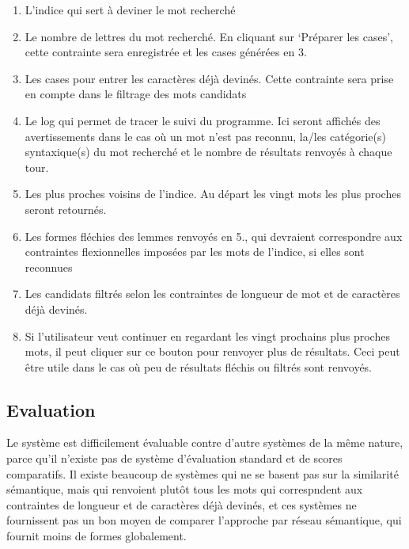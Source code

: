 \begin{enumerate}
    \item{L'indice qui sert à deviner le mot recherché}
    \item{Le nombre de lettres du mot recherché. En cliquant sur \lq{Préparer les cases}\rq, cette contrainte sera enregistrée et les cases générées en 3.}
    \item{Les cases pour entrer les caractères déjà devinés. Cette contrainte sera prise en compte dans le filtrage des mots candidats}
    \item{Le log qui permet de tracer le suivi du programme. Ici seront affichés des avertissements dans le cas où un mot n'est pas reconnu, la/les catégorie(s) syntaxique(s) du mot recherché et le nombre de résultats renvoyés à chaque tour.}
    \item{Les plus proches voisins de l'indice. Au départ les vingt mots les plus proches seront retournés.}
    \item{Les formes fléchies des lemmes renvoyés en 5., qui devraient correspondre aux contraintes flexionnelles imposées par les mots de l'indice, si elles sont reconnues}
    \item{Les candidats filtrés selon les contraintes de longueur de mot et de caractères déjà devinés.}
    \item{Si l'utilisateur veut continuer en regardant les vingt prochains plus proches mots, il peut cliquer sur ce bouton pour renvoyer plus de résultats. Ceci peut être utile dans le cas où peu de résultats fléchis ou filtrés sont renvoyés.}
    
\end{enumerate}


\subsection{Evaluation}
Le système est difficilement évaluable contre d'autre systèmes de la même nature, parce qu'il n'existe pas de système d'évaluation standard et de scores comparatifs. Il existe beaucoup de systèmes qui ne se basent pas sur la similarité sémantique, mais qui renvoient plutôt tous les mots qui correspndent aux contraintes de longueur et de caractères déjà devinés, et ces systèmes ne fournissent pas un bon moyen de comparer l'approche par réseau sémantique, qui fournit moins de formes globalement.


